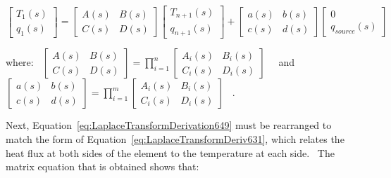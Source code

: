 \begin{equation}
\left[ {\begin{array}{*{20}{c}}{{T_1}\left( s \right)}\\ {{q_1}\left( s \right)}\end{array}} \right] = \left[ {\begin{array}{*{20}{c}}{A\left( s \right)}&{B\left( s \right)}\\ {C\left( s \right)}&{D\left( s \right)}\end{array}} \right]\left[ {\begin{array}{*{20}{c}}{{T_{n + 1}}\left( s \right)}\\ {{q_{n + 1}}\left( s \right)}\end{array}} \right] + \left[ {\begin{array}{*{20}{c}}{a\left( s \right)}&{b\left( s \right)}\\ {c\left( s \right)}&{d\left( s \right)}\end{array}} \right]\left[ {\begin{array}{*{20}{c}}0\\ {{q_{source}}\left( s \right)}\end{array}} \right]
\label{eq:LaplaceTransformDerivation649}
\end{equation}

where:~ \(\left[ {\begin{array}{*{20}{c}}{A\left( s \right)}&{B\left( s \right)}\\ {C\left( s \right)}&{D\left( s \right)}\end{array}} \right] = \prod\limits_{i = 1}^n {\left[ {\begin{array}{*{20}{c}}{{A_i}\left( s \right)}&{{B_i}\left( s \right)}\\ {{C_i}\left( s \right)}&{{D_i}\left( s \right)}\end{array}} \right]}\) ~~and~ \(\left[ {\begin{array}{*{20}{c}}{a\left( s \right)}&{b\left( s \right)}\\ {c\left( s \right)}&{d\left( s \right)}\end{array}} \right] = \prod\limits_{i = 1}^m {\left[ {\begin{array}{*{20}{c}}{{A_i}\left( s \right)}&{{B_i}\left( s \right)}\\ {{C_i}\left( s \right)}&{{D_i}\left( s \right)}\end{array}} \right]}\) ~.

Next, Equation~\ref{eq:LaplaceTransformDerivation649} must be rearranged to match the form of Equation~\ref{eq:LaplaceTransformDeriv631}, which relates the heat flux at both sides of the element to the temperature at each side.~ The matrix equation that is obtained shows that:

